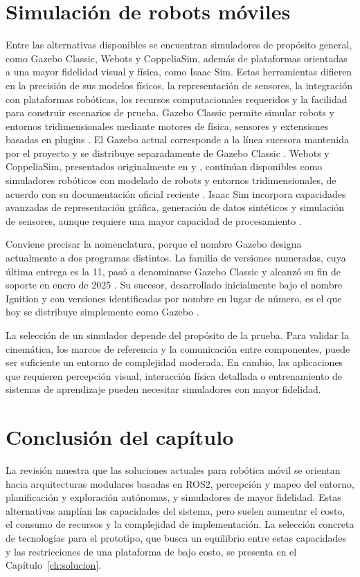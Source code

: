 \section{Simulación de robots móviles}
\label{sec:gemelo_digital}

Entre las alternativas disponibles se encuentran simuladores de propósito
general, como Gazebo Classic, Webots y CoppeliaSim, además de plataformas orientadas
a una mayor fidelidad visual y física, como Isaac Sim. Estas herramientas
difieren en la precisión de sus modelos físicos, la representación de
sensores, la integración con plataformas robóticas, los recursos
computacionales requeridos y la facilidad para construir escenarios de
prueba.
Gazebo Classic permite simular robots y entornos tridimensionales mediante
motores de física, sensores y extensiones basadas en plugins
\citep{osrf2025gazeboclassic}. El Gazebo actual corresponde a la línea
sucesora mantenida por el proyecto y se distribuye separadamente de Gazebo
Classic \citep{openrobotics2024gazebo}. Webots y CoppeliaSim, presentados
originalmente en \citet{michel2004webots} y \citet{rohmer2013coppeliasim},
continúan disponibles como simuladores robóticos con modelado de robots y
entornos tridimensionales, de acuerdo con su documentación oficial reciente
\citep{cyberbotics2025webots,coppelia2025version}. Isaac Sim incorpora
capacidades avanzadas de representación gráfica, generación de
datos sintéticos y simulación de sensores, aunque requiere una mayor
capacidad de procesamiento \citep{nvidia2025isaacsim}.

Conviene precisar la nomenclatura, porque el nombre Gazebo designa
actualmente a dos programas distintos. La familia de versiones numeradas,
cuya última entrega es la 11, pasó a denominarse Gazebo Classic y alcanzó
su fin de soporte en enero de 2025 \citep{osrf2025gazeboclassic}. Su
sucesor, desarrollado inicialmente bajo el nombre Ignition y con versiones
identificadas por nombre en lugar de número, es el que hoy se distribuye
simplemente como Gazebo \citep{openrobotics2025gzmigration}.

La selección de un simulador depende del propósito de la prueba. Para validar
la cinemática, los marcos de referencia y la comunicación entre componentes,
puede ser suficiente un entorno de complejidad moderada. En cambio, las
aplicaciones que requieren percepción visual, interacción física detallada o
entrenamiento de sistemas de aprendizaje pueden necesitar simuladores con
mayor fidelidad.

\section*{Conclusión del capítulo}

La revisión muestra que las soluciones actuales para robótica móvil se
orientan hacia arquitecturas modulares basadas en \gls{ROS2}, percepción y
mapeo del entorno, planificación y exploración autónomas, y simuladores de
mayor fidelidad. Estas alternativas amplían las capacidades del sistema, pero suelen aumentar el costo, el consumo de recursos y la complejidad de
implementación. La selección concreta de tecnologías para el prototipo, que
busca un equilibrio entre estas capacidades y las restricciones de una
plataforma de bajo costo, se presenta en el Capítulo~\ref{ch:solucion}.